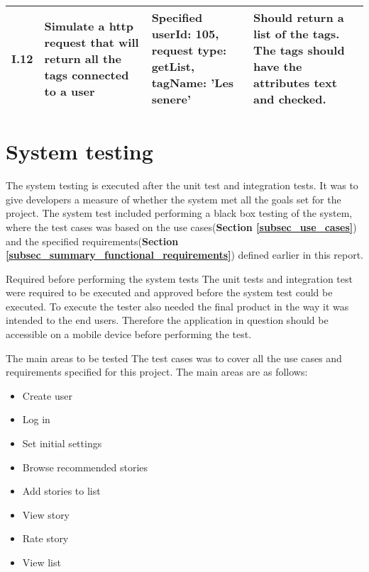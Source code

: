 {{\begin{center}
\begin{longtable}{ | p{1cm} | p{6.5cm} | p{3cm} | p{6.5cm} |}
					
			I.12 & Simulate a http request that will return all the tags connected to a user  & Specified userId: 105, \newline request type: getList, \newline tagName: 'Les senere' & Should return a list of the tags. The tags should have the attributes text and checked. \\ \hline	

\end{longtable}
\end{center}

\section{System testing}

The system testing is executed after the unit test and integration tests. It was to give developers a measure of whether the system met all the goals set for the project.  The system test included performing a black box testing of the system, where the test cases was based on the use cases(\textbf{Section \ref{subsec_use_cases}}) and the specified requirements(\textbf{Section \ref{subsec_summary_functional_requirements}})  defined earlier in this report. \newline

Required before performing the system tests\newline
The unit tests and integration test were required to be executed and approved before the system test could be executed. To execute the tester also needed the final product in the way it was intended to the end users. Therefore the application in question should be accessible on a mobile device before performing the test. \newline

The main areas to be tested\newline
The test cases was to cover all the use cases and requirements specified for this project. The main areas are as follows:
\begin{itemize}
	\item Create user
	\item Log in
	\item Set initial settings
	\item Browse recommended stories
	\item Add stories to list
	\item View story
	\item Rate story 
	\item View list \newline
\end{itemize}

}}
